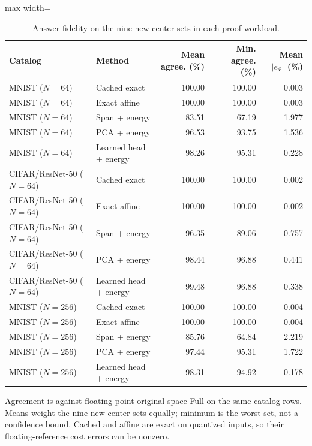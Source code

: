 \documentclass[5p,times,twocolumn]{elsarticle}
\theoremstyle{plain}
\theoremstyle{definition}
\theoremstyle{remark}
\begin{document}
\par\endgroup
\begingroup\color{RevisionGreen}
\begin{table}[tp]\color{RevisionGreen}
\caption{Answer fidelity on the nine new center sets in each proof workload.}\label{tab:reuse-quality}
\centering\small
\begin{adjustbox}{max width=\textwidth}
\begin{tabular}{@{}llrrr@{}}
\toprule
Catalog & Method & Mean agree. (\%) & Min. agree. (\%) & Mean $|e_\Psi|$ (\%) \\
\midrule
MNIST ($N=64$) & Cached exact & 100.00 & 100.00 & 0.003 \\
MNIST ($N=64$) & Exact affine & 100.00 & 100.00 & 0.003 \\
MNIST ($N=64$) & Span + energy & 83.51 & 67.19 & 1.977 \\
MNIST ($N=64$) & PCA + energy & 96.53 & 93.75 & 1.536 \\
MNIST ($N=64$) & Learned head + energy & 98.26 & 95.31 & 0.228 \\
CIFAR/ResNet-50 ($N=64$) & Cached exact & 100.00 & 100.00 & 0.002 \\
CIFAR/ResNet-50 ($N=64$) & Exact affine & 100.00 & 100.00 & 0.002 \\
CIFAR/ResNet-50 ($N=64$) & Span + energy & 96.35 & 89.06 & 0.757 \\
CIFAR/ResNet-50 ($N=64$) & PCA + energy & 98.44 & 96.88 & 0.441 \\
CIFAR/ResNet-50 ($N=64$) & Learned head + energy & 99.48 & 96.88 & 0.338 \\
MNIST ($N=256$) & Cached exact & 100.00 & 100.00 & 0.004 \\
MNIST ($N=256$) & Exact affine & 100.00 & 100.00 & 0.004 \\
MNIST ($N=256$) & Span + energy & 85.76 & 64.84 & 2.219 \\
MNIST ($N=256$) & PCA + energy & 97.44 & 95.31 & 1.722 \\
MNIST ($N=256$) & Learned head + energy & 98.31 & 94.92 & 0.178 \\
\bottomrule
\end{tabular}
\end{adjustbox}
\par\smallskip\begin{minipage}{0.98\textwidth}\footnotesize Agreement is against floating-point original-space Full on the same catalog rows. Means weight the nine new center sets equally; minimum is the worst set, not a confidence bound. Cached and affine are exact on quantized inputs, so their floating-reference cost errors can be nonzero.\end{minipage}
\end{table}
\end{document}

